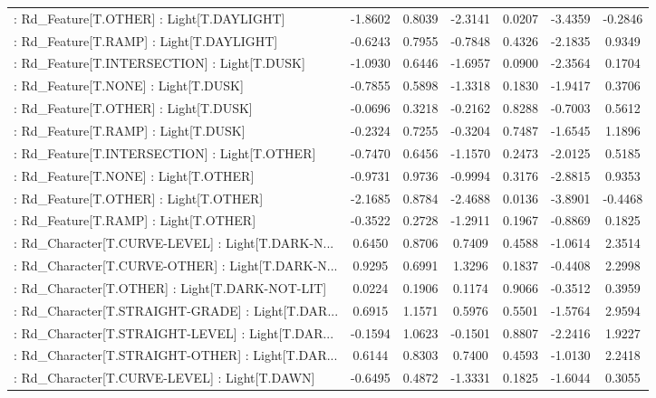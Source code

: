 \begin{longtable}{p{4cm}cccccc}
 : Rd\_Feature[T.OTHER] : Light[T.DAYLIGHT]         & -1.8602 &    0.8039 & -2.3141 &       0.0207 & -3.4359 & -0.2846 \\
 : Rd\_Feature[T.RAMP] : Light[T.DAYLIGHT]          & -0.6243 &    0.7955 & -0.7848 &       0.4326 & -2.1835 &  0.9349 \\
 : Rd\_Feature[T.INTERSECTION] : Light[T.DUSK]      & -1.0930 &    0.6446 & -1.6957 &       0.0900 & -2.3564 &  0.1704 \\
 : Rd\_Feature[T.NONE] : Light[T.DUSK]              & -0.7855 &    0.5898 & -1.3318 &       0.1830 & -1.9417 &  0.3706 \\
 : Rd\_Feature[T.OTHER] : Light[T.DUSK]             & -0.0696 &    0.3218 & -0.2162 &       0.8288 & -0.7003 &  0.5612 \\
 : Rd\_Feature[T.RAMP] : Light[T.DUSK]              & -0.2324 &    0.7255 & -0.3204 &       0.7487 & -1.6545 &  1.1896 \\
 : Rd\_Feature[T.INTERSECTION] : Light[T.OTHER]     & -0.7470 &    0.6456 & -1.1570 &       0.2473 & -2.0125 &  0.5185 \\
 : Rd\_Feature[T.NONE] : Light[T.OTHER]             & -0.9731 &    0.9736 & -0.9994 &       0.3176 & -2.8815 &  0.9353 \\
 : Rd\_Feature[T.OTHER] : Light[T.OTHER]            & -2.1685 &    0.8784 & -2.4688 &       0.0136 & -3.8901 & -0.4468 \\
 : Rd\_Feature[T.RAMP] : Light[T.OTHER]             & -0.3522 &    0.2728 & -1.2911 &       0.1967 & -0.8869 &  0.1825 \\
 : Rd\_Character[T.CURVE-LEVEL] : Light[T.DARK-N... &  0.6450 &    0.8706 &  0.7409 &       0.4588 & -1.0614 &  2.3514 \\
 : Rd\_Character[T.CURVE-OTHER] : Light[T.DARK-N... &  0.9295 &    0.6991 &  1.3296 &       0.1837 & -0.4408 &  2.2998 \\
 : Rd\_Character[T.OTHER] : Light[T.DARK-NOT-LIT]   &  0.0224 &    0.1906 &  0.1174 &       0.9066 & -0.3512 &  0.3959 \\
 : Rd\_Character[T.STRAIGHT-GRADE] : Light[T.DAR... &  0.6915 &    1.1571 &  0.5976 &       0.5501 & -1.5764 &  2.9594 \\
 : Rd\_Character[T.STRAIGHT-LEVEL] : Light[T.DAR... & -0.1594 &    1.0623 & -0.1501 &       0.8807 & -2.2416 &  1.9227 \\
 : Rd\_Character[T.STRAIGHT-OTHER] : Light[T.DAR... &  0.6144 &    0.8303 &  0.7400 &       0.4593 & -1.0130 &  2.2418 \\
 : Rd\_Character[T.CURVE-LEVEL] : Light[T.DAWN]     & -0.6495 &    0.4872 & -1.3331 &       0.1825 & -1.6044 &  0.3055 \\

\end{longtable}
